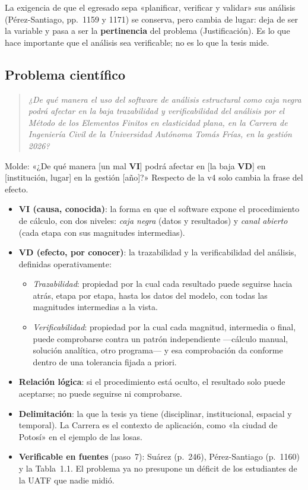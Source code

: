 \documentclass[11pt,a4paper]{article}
\newcommand{\vi}{\textbf{VI}}
\newcommand{\vd}{\textbf{VD}}
\newcommand{\molde}[1]{\textcolor{blue!60!black}{\small #1}}
\newcommand{\pegar}[1]{\begin{quote}\itshape #1\end{quote}}
\begin{document}
La exigencia de que el egresado sepa «planificar, verificar y validar» sus análisis (Pérez-Santiago, pp.~1159 y 1171) se conserva, pero cambia de lugar: deja de ser la variable y pasa a ser la \textbf{pertinencia} del problema (Justificación). Es lo que hace importante que el análisis sea verificable; no es lo que la tesis mide.

\subsection{Problema científico}

\pegar{¿De qué manera el uso del software de análisis estructural como caja negra podrá afectar en la baja trazabilidad y verificabilidad del análisis por el Método de los Elementos Finitos en elasticidad plana, en la Carrera de Ingeniería Civil de la Universidad Autónoma Tomás Frías, en la gestión 2026?}

\molde{Molde: «¿De qué manera [un mal \vi] podrá afectar en [la baja \vd] en [institución, lugar] en la gestión [año]?»} Respecto de la v4 solo cambia la frase del efecto.

\begin{itemize}
\item \textbf{\vi{} (causa, conocida)}: la forma en que el software expone el procedimiento de cálculo, con dos niveles: \emph{caja negra} (datos y resultados) y \emph{canal abierto} (cada etapa con sus magnitudes intermedias).
\item \textbf{\vd{} (efecto, por conocer)}: la trazabilidad y la verificabilidad del análisis, definidas operativamente:
  \begin{itemize}
  \item \emph{Trazabilidad}: propiedad por la cual cada resultado puede seguirse hacia atrás, etapa por etapa, hasta los datos del modelo, con todas las magnitudes intermedias a la vista.
  \item \emph{Verificabilidad}: propiedad por la cual cada magnitud, intermedia o final, puede comprobarse contra un patrón independiente —cálculo manual, solución analítica, otro programa— y esa comprobación da conforme dentro de una tolerancia fijada a priori.
  \end{itemize}
\item \textbf{Relación lógica}: si el procedimiento está oculto, el resultado solo puede aceptarse; no puede seguirse ni comprobarse.
\item \textbf{Delimitación}: la que la tesis ya tiene (disciplinar, institucional, espacial y temporal). La Carrera es el contexto de aplicación, como «la ciudad de Potosí» en el ejemplo de las losas.
\item \textbf{Verificable en fuentes} (paso~7): Suárez (p.~246), Pérez-Santiago (p.~1160) y la Tabla~1.1. El problema ya no presupone un déficit de los estudiantes de la UATF que nadie midió.
\end{itemize}
\end{document}
